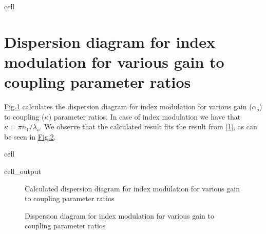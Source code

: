 \documentclass[a4paper,10pt,english,openany,oneside]{jupyterBook}
\begin{document}
\begin{sphinxuseclass}{cell}
\end{sphinxuseclass}

\section{Dispersion diagram for index modulation for various gain to coupling parameter ratios}
\label{\detokenize{Kogelnik-Shank_Coupled-Wave-Theory_DFB-Lasers:dispersion-diagram-for-index-modulation-for-various-gain-to-coupling-parameter-ratios}}
\sphinxAtStartPar
\hyperref[\detokenize{Kogelnik-Shank_Coupled-Wave-Theory_DFB-Lasers:kogelnik1}]{Fig.\@ \ref{\detokenize{Kogelnik-Shank_Coupled-Wave-Theory_DFB-Lasers:kogelnik1}}} calculates the dispersion diagram for index modulation for various gain (\(\alpha_o\)) to coupling (\(\kappa\)) parameter ratios. In case of index modulation we have that \(\kappa= \pi n_1/\lambda_o\). We observe that the calculated result fits the result from {[}\hyperlink{cite.bib:id3}{1}{]}, as can be seen in \hyperref[\detokenize{Kogelnik-Shank_Coupled-Wave-Theory_DFB-Lasers:kogelnik2}]{Fig.\@ \ref{\detokenize{Kogelnik-Shank_Coupled-Wave-Theory_DFB-Lasers:kogelnik2}}}.

\begin{sphinxuseclass}{cell}\begin{sphinxVerbatimOutput}

\begin{sphinxuseclass}{cell_output}
\begin{figure}[htbp]
\centering
\capstart

\noindent{}
\caption{Calculated dispersion diagram for index modulation for various gain to coupling parameter ratios}\label{\detokenize{Kogelnik-Shank_Coupled-Wave-Theory_DFB-Lasers:kogelnik1}}\end{figure}

\end{sphinxuseclass}\end{sphinxVerbatimOutput}

\end{sphinxuseclass}
\begin{figure}[htbp]
\centering
\capstart

\noindent{}
\caption{Dispersion diagram for index modulation for various gain to coupling parameter ratios}\label{\detokenize{Kogelnik-Shank_Coupled-Wave-Theory_DFB-Lasers:kogelnik2}}\end{figure}
\end{document}
